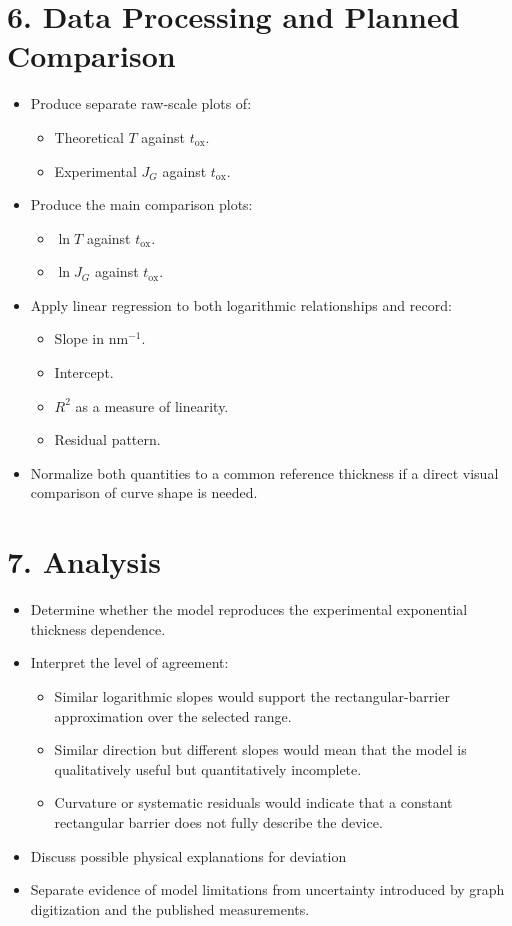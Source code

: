 \documentclass[12pt]{article}
\begin{document}
\section*{6. Data Processing and Planned Comparison}
\begin{itemize}
    \item Produce separate raw-scale plots of:
    \begin{itemize}
        \item Theoretical \(T\) against \(t_{\mathrm{ox}}\).
        \item Experimental \(J_G\) against \(t_{\mathrm{ox}}\).
    \end{itemize}
    \item Produce the main comparison plots:
    \begin{itemize}
        \item \(\ln T\) against \(t_{\mathrm{ox}}\).
        \item \(\ln J_G\) against \(t_{\mathrm{ox}}\).
    \end{itemize}
    \item Apply linear regression to both logarithmic relationships and record:
    \begin{itemize}
        \item Slope in \(\mathrm{nm}^{-1}\).
        \item Intercept.
        \item \(R^2\) as a measure of linearity.
        \item Residual pattern.
    \end{itemize}
    \item Normalize both quantities to a common reference thickness if a direct visual comparison of curve shape is needed.
\end{itemize}

\section*{7. Analysis}
\begin{itemize}
    \item Determine whether the model reproduces the experimental exponential thickness dependence.
    \item Interpret the level of agreement:
    \begin{itemize}
        \item Similar logarithmic slopes would support the rectangular-barrier approximation over the selected range.
        \item Similar direction but different slopes would mean that the model is qualitatively useful but quantitatively incomplete.
        \item Curvature or systematic residuals would indicate that a constant rectangular barrier does not fully describe the device.
    \end{itemize}
    \item Discuss possible physical explanations for deviation
    \item Separate evidence of model limitations from uncertainty introduced by graph digitization and the published measurements.
    \end{itemize}
\end{document}
